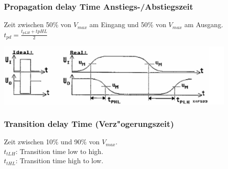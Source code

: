 	\subsubsection{Propagation delay Time Anstiegs-/Abstiegszeit}
		\begin{minipage}[c]{8 cm}
			Zeit zwischen 50\% von $V_{max}$ am Eingang und 50\% von $V_{max}$ am Ausgang.\\
			\newline
			$t_{pd}=\frac{t_{pLH}+t{pHL}}{2}$\\
		\end{minipage}	
		\begin{minipage}[c]{10 cm}
			\includegraphics[width=0.9\textwidth]{pics/delay}
		\end{minipage}	
		
	\subsubsection{Transition delay Time (Verz"ogerungszeit)}
		Zeit zwischen 10\% und 90\% von $V_{max}$.\\
		$t_{tLH}$: Transition time low to high.\\
		$t_{tHL}$: Transition time high to low.\\
		
